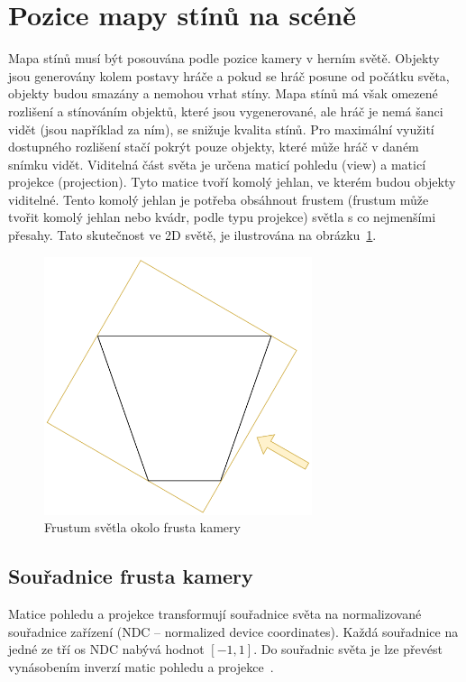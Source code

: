 \documentclass[thesis=M,czech]{FITthesis}[2019/12/23]
\begin{document}
\section{Pozice mapy stínů na scéně}

Mapa stínů musí být posouvána podle pozice kamery v herním světě. Objekty jsou generovány kolem postavy hráče a pokud se hráč posune od počátku světa, objekty budou smazány a nemohou vrhat stíny. Mapa stínů má však omezené rozlišení a stínováním objektů, které jsou vygenerované, ale hráč je nemá šanci vidět (jsou například za ním), se snižuje kvalita stínů. Pro maximální využití dostupného rozlišení stačí pokrýt pouze objekty, které může hráč v daném snímku vidět. Viditelná část světa je určena maticí pohledu (view) a maticí projekce (projection). Tyto matice tvoří komolý jehlan, ve kterém budou objekty viditelné. Tento komolý jehlan je potřeba obsáhnout frustem (frustum může tvořit komolý jehlan nebo kvádr, podle typu projekce) světla s co nejmenšími přesahy. Tato skutečnost ve 2D světě, je ilustrována na obrázku~\ref{fig:shadows_frustum_fit}.

\begin{figure}\centering
	\includegraphics[width=0.7\textwidth]{images/shadows/frustum_fit}
	\caption[Frustum světla okolo frusta kamery]{Frustum světla okolo frusta kamery}\label{fig:shadows_frustum_fit}
\end{figure}

\subsection{Souřadnice frusta kamery}

Matice pohledu a projekce transformují souřadnice světa na normalizované souřadnice zařízení (NDC – normalized device coordinates). Každá souřadnice na jedné ze tří os NDC nabývá hodnot $[-1, 1]$. Do souřadnic světa je lze převést vynásobením inverzí matic pohledu a projekce~\cite{lopgl_csm}.
\end{document}
